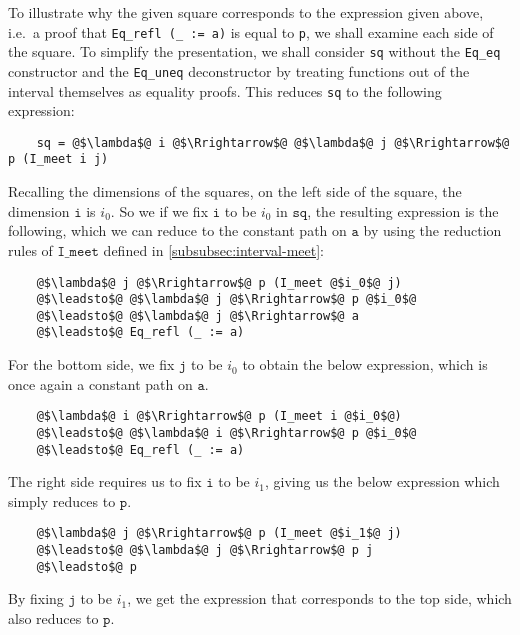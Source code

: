 \documentclass[12pt,twoside,maitrise]{dms}
\theoremstyle{definition}
\numberwithin{equation}{section}
\numberwithin{table}{chapter}
\numberwithin{figure}{chapter}
\newcommand\id[1] {\texttt{#1}}
\newcommand\fn[1] {\texttt{#1}}
\begin{document}
To illustrate why the given square corresponds to the expression given above,
i.e.\ a proof that \fn{Eq\_refl (\_ := a)} is equal to \id{p}, we shall examine
each side of the square. To simplify the presentation, we shall consider \id{sq}
without the \id{Eq\_eq} constructor and the \id{Eq\_uneq} deconstructor by
treating functions out of the interval themselves as equality proofs. This
reduces \id{sq} to the following expression:

\begin{verbatim}
    sq = @$\lambda$@ i @$\Rrightarrow$@ @$\lambda$@ j @$\Rrightarrow$@ p (I_meet i j)
\end{verbatim}

Recalling the dimensions of the squares, on the left side of the square, the
dimension $\fn{i}$ is $i_0$. So we if we fix $\fn{i}$ to be $i_0$ in $\fn{sq}$,
the resulting expression is the following, which we can reduce to the constant
path on $\fn{a}$ by using the reduction rules of $\fn{I\_meet}$ defined in
\autoref{subsubsec:interval-meet}:

\begin{verbatim}
    @$\lambda$@ j @$\Rrightarrow$@ p (I_meet @$i_0$@ j)
    @$\leadsto$@ @$\lambda$@ j @$\Rrightarrow$@ p @$i_0$@
    @$\leadsto$@ @$\lambda$@ j @$\Rrightarrow$@ a
    @$\leadsto$@ Eq_refl (_ := a)
\end{verbatim}

For the bottom side, we fix $\fn{j}$ to be $i_0$ to obtain the below expression,
which is once again a constant path on $\fn{a}$.

\begin{verbatim}
    @$\lambda$@ i @$\Rrightarrow$@ p (I_meet i @$i_0$@)
    @$\leadsto$@ @$\lambda$@ i @$\Rrightarrow$@ p @$i_0$@
    @$\leadsto$@ Eq_refl (_ := a)
\end{verbatim}

The right side requires us to fix $\fn{i}$ to be $i_1$, giving us the below
expression which simply reduces to $\fn{p}$.

\begin{verbatim}
    @$\lambda$@ j @$\Rrightarrow$@ p (I_meet @$i_1$@ j)
    @$\leadsto$@ @$\lambda$@ j @$\Rrightarrow$@ p j
    @$\leadsto$@ p
\end{verbatim}

By fixing $\fn{j}$ to be $i_1$, we get the expression that corresponds to the top side, which also reduces to $\fn{p}$.
\end{document}
